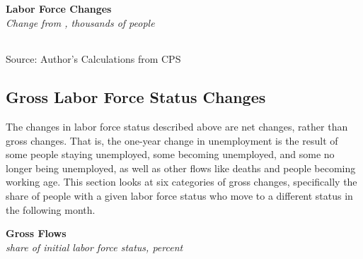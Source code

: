 \documentclass{report}
\begin{document}
{\begin{minipage}{0.76\textwidth}
\normalsize \textbf{Labor Force Changes}\\
\footnotesize{\textit{Change from \unskip, thousands of people}}\\
\noindent {} \setlength{\tabcolsep}{3.0pt} \color{black!90}
		{\renewcommand{\arraystretch}{1.52}
		 \begin{tabular}{p{27.8mm} R{11.2mm} R{10.4mm} R{10.4mm} R{10.2mm} 
		 				 R{10.6mm} R{10.4mm} R{10.4mm}}
			  \hline
		\end{tabular}}
		\vspace{-2mm}
		
\footnotesize{Source: Author's Calculations from CPS}
\end{minipage}
\newpage
\subsection*{\color{black!70} \seriffont Gross Labor Force Status Changes}
\begin{minipage}{0.76\textwidth}
\small The changes in labor force status described above are net changes, rather than gross changes. That is, the one-year change in unemployment is the result of some people staying unemployed, some becoming unemployed, and some no longer being unemployed, as well as other flows like deaths and people becoming working age. This section looks at six categories of gross changes, specifically the share of people with a given labor force status who move to a different status in the following month. 
\end{minipage}
\vspace{2mm}

\normalsize \textbf{Gross Flows}\\
\footnotesize{\textit{share of initial labor force status, percent}}

}
\end{document}
